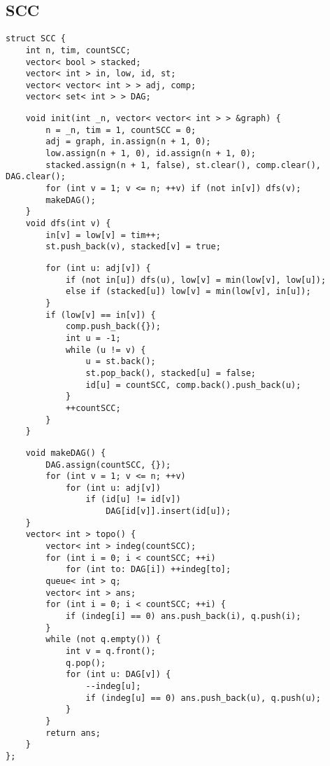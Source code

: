 \documentclass[twoside]{article}
\begin{document}
\begin{multicols*}{2}
{\subsection*{SCC}
}
\begin{verbatim}
struct SCC {
    int n, tim, countSCC;
    vector< bool > stacked;
    vector< int > in, low, id, st;
    vector< vector< int > > adj, comp;
    vector< set< int > > DAG;
\end{verbatim}
\vspace{-12pt}
\begin{verbatim}
    void init(int _n, vector< vector< int > > &graph) {
        n = _n, tim = 1, countSCC = 0;
        adj = graph, in.assign(n + 1, 0);
        low.assign(n + 1, 0), id.assign(n + 1, 0);
        stacked.assign(n + 1, false), st.clear(), comp.clear(), DAG.clear();
        for (int v = 1; v <= n; ++v) if (not in[v]) dfs(v);
        makeDAG();
    }
    void dfs(int v) {
        in[v] = low[v] = tim++;
        st.push_back(v), stacked[v] = true;
\end{verbatim}
\vspace{-12pt}
\begin{verbatim}
        for (int u: adj[v]) {
            if (not in[u]) dfs(u), low[v] = min(low[v], low[u]);
            else if (stacked[u]) low[v] = min(low[v], in[u]);
        }
        if (low[v] == in[v]) {
            comp.push_back({});
            int u = -1;
            while (u != v) {
                u = st.back();
                st.pop_back(), stacked[u] = false;
                id[u] = countSCC, comp.back().push_back(u);
            }
            ++countSCC;
        }
    }
\end{verbatim}
\vspace{-12pt}
\begin{verbatim}
    void makeDAG() {
        DAG.assign(countSCC, {});
        for (int v = 1; v <= n; ++v)
            for (int u: adj[v])
                if (id[u] != id[v])
                    DAG[id[v]].insert(id[u]);
    }
    vector< int > topo() {
        vector< int > indeg(countSCC);
        for (int i = 0; i < countSCC; ++i)
            for (int to: DAG[i]) ++indeg[to];
        queue< int > q;
        vector< int > ans;
        for (int i = 0; i < countSCC; ++i) {
            if (indeg[i] == 0) ans.push_back(i), q.push(i);
        }
        while (not q.empty()) {
            int v = q.front();
            q.pop();
            for (int u: DAG[v]) {
                --indeg[u];
                if (indeg[u] == 0) ans.push_back(u), q.push(u);
            }
        }
        return ans;
    }
};
\end{verbatim}


\end{multicols*}
\end{document}
